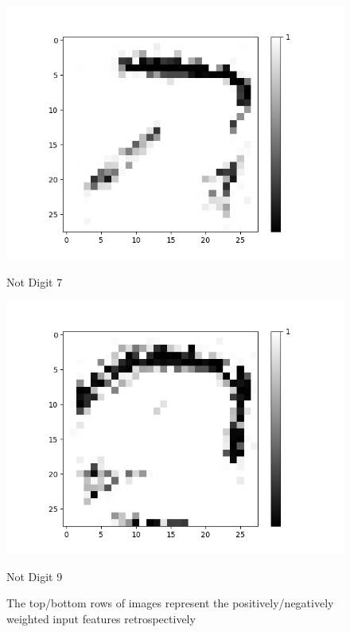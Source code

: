 \begin{figure}[H]
\begin{minipage}[b]{0.19\textwidth}
		\includegraphics[width=\textwidth]{AND(NO-LSM)/Negative/Layer0-Neuron-7.png}
		\caption{Not Digit 7}
		\label{fig:cnf-descrete-generalizatiion}
	\end{minipage}
	\begin{minipage}[b]{0.19\textwidth}
		\captionsetup{labelformat=empty}
		\includegraphics[width=\textwidth]{AND(NO-LSM)/Negative/Layer0-Neuron-9.png}
		\caption{Not Digit 9}
		\label{fig:cnf-descrete-generalizatiion}
	\end{minipage}
	\label{fig:and-net-new-archetchure-with-out-lsm-interp}
	\caption{The top/bottom rows of images represent the positively/negatively weighted input features retrospectively}
	\hfill
\end{figure}

